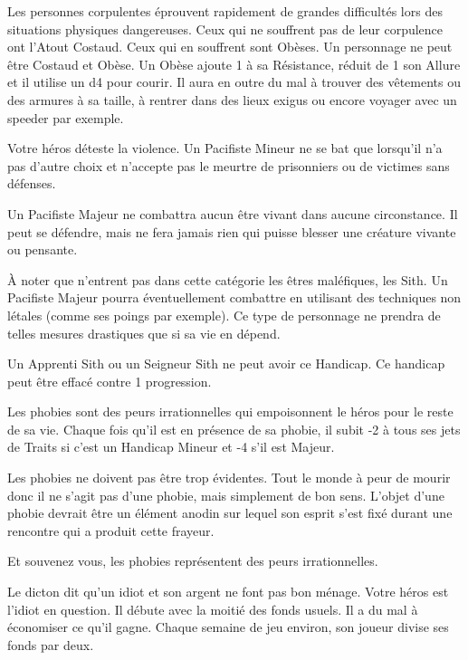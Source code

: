 \begin{description}[align=left]
    \item [Obèse (Mineur)]
        Les personnes corpulentes éprouvent rapidement de grandes difficultés lors des situations physiques dangereuses. Ceux qui ne souffrent pas de leur corpulence ont l’Atout Costaud. Ceux qui en souffrent sont Obèses. Un personnage ne peut être Costaud et Obèse. Un Obèse ajoute 1 à sa Résistance, réduit de 1 son Allure et il utilise un d4 pour courir. Il aura en outre du mal à trouver des vêtements ou des armures à sa taille, à rentrer dans des lieux exigus ou encore voyager avec un speeder par exemple.

    \item [Pacifiste (Mineur ou Majeur)]
        Votre héros déteste la violence. Un Pacifiste Mineur ne se bat que lorsqu’il n’a pas d’autre choix et n’accepte pas le meurtre de prisonniers ou de victimes sans défenses. 

        Un Pacifiste Majeur ne combattra aucun être vivant dans aucune circonstance. Il peut se défendre, mais ne fera jamais rien qui puisse blesser une créature vivante ou pensante. 

        À noter que n’entrent pas dans cette catégorie les êtres maléfiques, les Sith. Un Pacifiste Majeur pourra éventuellement combattre en utilisant des techniques non létales (comme ses poings par exemple). Ce type de personnage ne prendra de telles mesures drastiques que si sa vie en dépend.

        Un Apprenti Sith ou un Seigneur Sith ne peut avoir ce Handicap. Ce handicap peut être effacé contre 1 progression.

    \item [Phobie (Mineur ou Majeur)]
        Les phobies sont des peurs irrationnelles qui empoisonnent le héros pour le reste de sa vie. Chaque fois qu’il est en présence de sa phobie, il subit -2 à tous ses jets de Traits si c’est un Handicap Mineur et -4 s’il est Majeur. 

        Les phobies ne doivent pas être trop évidentes. Tout le monde à peur de mourir donc il ne s’agit pas d’une phobie, mais simplement de bon sens. L’objet d’une phobie devrait être un élément anodin sur lequel son esprit s’est fixé durant une rencontre qui a produit cette frayeur.

        Et souvenez vous, les phobies représentent des peurs irrationnelles.

    \item [Poches percées (Mineur)]
        Le dicton dit qu’un idiot et son argent ne font pas bon ménage. Votre héros est l’idiot en question. Il débute avec la moitié des fonds usuels. Il a du mal à économiser ce qu’il gagne. Chaque semaine de jeu environ, son joueur divise ses fonds par deux.


\end{description}

